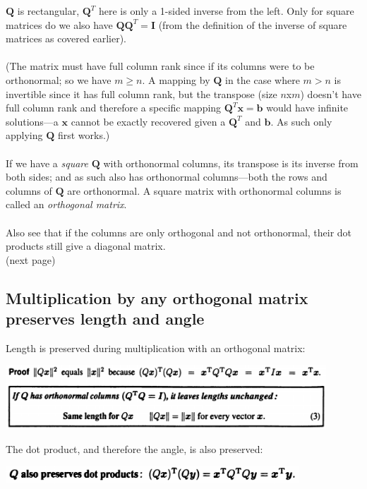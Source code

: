 \documentclass{report}
\begin{document}
$\bm Q$ is rectangular, $\bm Q^T$ here is only a 1-sided inverse from the left.
Only for square matrices do we also have $\bm{QQ}^T=\bm I$ (from the definition of the inverse of square matrices as covered earlier).\\
\vspace{1mm}\\
(The matrix must have full column rank since if its columns were to be orthonormal; 
so we have $m\geq n$. A mapping by $\bm Q$ in the case where $m>n$ is invertible since it has full column rank, but the transpose (size $n$x$m$) doesn't have full column 
rank and therefore a specific mapping $\bm Q^T\bm x=\bm b$ would have infinite solutions---a $\bm x$ cannot be exactly recovered given a $\bm Q^T$ and $\bm b$. As such only 
applying $\bm Q$ first works.)\\
\vspace{1mm}\\
If we have a \textit{square} $\bm Q$ with orthonormal columns, its transpose is its inverse from both sides; and as such also has orthonormal columns---both the rows 
and columns of $\bm Q$ are orthonormal. A square matrix with orthonormal columns is called an \textit{orthogonal matrix}.\\
\vspace{1mm}\\
Also see that if the columns are only orthogonal and not orthonormal, their dot products still give a diagonal matrix.\\
(next page)\newpage
\subsection{Multiplication by any orthogonal matrix preserves length and angle}
Length is preserved during multiplication with an orthogonal matrix:
\begin{center}
\includegraphics[width=12cm]{83}
\end{center}
The dot product, and therefore the angle, is also preserved:
\begin{center}
\includegraphics[width=11cm]{84}
\end{center}
\end{document}
